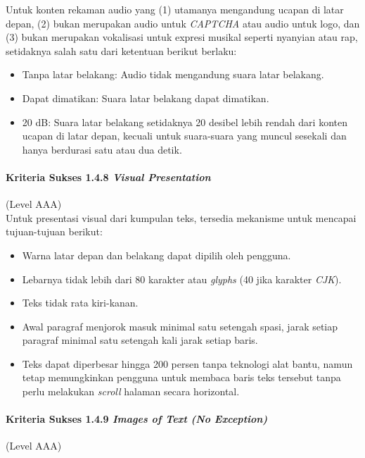 \documentclass[a4paper,twoside]{article}
\begin{document}
\begin{enumerate}
		Untuk konten rekaman audio yang (1) utamanya mengandung ucapan di latar depan, (2) bukan merupakan audio untuk \textit{CAPTCHA} atau audio untuk logo, dan (3) bukan merupakan vokalisasi untuk expresi musikal seperti nyanyian atau rap, setidaknya salah satu dari ketentuan berikut berlaku:

		\begin{itemize}
			\item Tanpa latar belakang: Audio tidak mengandung suara latar belakang.
			\item Dapat dimatikan: Suara latar belakang dapat dimatikan.
			\item 20 dB: Suara latar belakang setidaknya 20 desibel lebih rendah dari konten ucapan di latar depan, kecuali untuk suara-suara yang muncul sesekali dan hanya berdurasi satu atau dua detik.
		\end{itemize}

		\paragraph{Kriteria Sukses 1.4.8 \textit{Visual Presentation}}
		\label{sec:kriteria_sukses_1.4.8}
		(Level AAA)\\

		Untuk presentasi visual dari kumpulan teks, tersedia mekanisme untuk mencapai tujuan-tujuan berikut:

		\begin{itemize}
			\item Warna latar depan dan belakang dapat dipilih oleh pengguna.
			\item Lebarnya tidak lebih dari 80 karakter atau \textit{glyphs} (40 jika karakter \textit{CJK}).
			\item Teks tidak rata kiri-kanan.
			\item Awal paragraf menjorok masuk minimal satu setengah spasi, jarak setiap paragraf minimal satu setengah kali jarak setiap baris.
			\item Teks dapat diperbesar hingga 200 persen tanpa teknologi alat bantu, namun tetap memungkinkan pengguna untuk membaca baris teks tersebut tanpa perlu melakukan \textit{scroll} halaman secara horizontal.
		\end{itemize}

		\paragraph{Kriteria Sukses 1.4.9 \textit{Images of Text (No Exception)}}
		\label{sec:kriteria_sukses_1.4.9}
		(Level AAA)\\


\end{enumerate}
\end{document}
